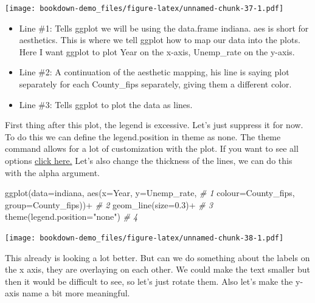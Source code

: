 \documentclass[
]{book}
\newenvironment{Shaded}{\begin{snugshade}}{\end{snugshade}}
\newcommand{\AttributeTok}[1]{\textcolor[rgb]{0.77,0.63,0.00}{#1}}
\newcommand{\CommentTok}[1]{\textcolor[rgb]{0.56,0.35,0.01}{\textit{#1}}}
\newcommand{\FloatTok}[1]{\textcolor[rgb]{0.00,0.00,0.81}{#1}}
\newcommand{\FunctionTok}[1]{\textcolor[rgb]{0.00,0.00,0.00}{#1}}
\newcommand{\NormalTok}[1]{#1}
\newcommand{\SpecialCharTok}[1]{\textcolor[rgb]{0.00,0.00,0.00}{#1}}
\newcommand{\StringTok}[1]{\textcolor[rgb]{0.31,0.60,0.02}{#1}}
\providecommand{\tightlist}{%
  \setlength{\itemsep}{0pt}\setlength{\parskip}{0pt}}
\begin{document}
\texttt{[image: bookdown-demo\_files/figure-latex/unnamed-chunk-37-1.pdf]}

\begin{itemize}
\tightlist
\item
  Line \#1: Tells ggplot we will be using the data.frame indiana. aes is short for aesthetics. This is where we tell ggplot how to map our data into the plots. Here I want ggplot to plot Year on the x-axis, Unemp\_rate on the y-axis.
\item
  Line \#2: A continuation of the aesthetic mapping, his line is saying plot separately for each County\_fips separately, giving them a different color.
\item
  Line \#3: Tells ggplot to plot the data as lines.
\end{itemize}

First thing after this plot, the legend is excessive. Let's just suppress it for now. To do this we can define the legend.position in theme as none. The theme command allows for a lot of customization with the plot. If you want to see all options \href{https://ggplot2.tidyverse.org/reference/theme.html}{click here.} Let's also change the thickness of the lines, we can do this with the alpha argument.

\begin{Shaded}
\begin{Highlighting}[]
\FunctionTok{ggplot}\NormalTok{(}\AttributeTok{data=}\NormalTok{indiana, }\FunctionTok{aes}\NormalTok{(}\AttributeTok{x=}\NormalTok{Year, }\AttributeTok{y=}\NormalTok{Unemp\_rate,   }\CommentTok{\# 1}
    \AttributeTok{colour=}\NormalTok{County\_fips, }\AttributeTok{group=}\NormalTok{County\_fips))}\SpecialCharTok{+}     \CommentTok{\# 2}
  \FunctionTok{geom\_line}\NormalTok{(}\AttributeTok{size=}\FloatTok{0.3}\NormalTok{)}\SpecialCharTok{+}                           \CommentTok{\# 3}
  \FunctionTok{theme}\NormalTok{(}\AttributeTok{legend.position=}\StringTok{"none"}\NormalTok{)                  }\CommentTok{\# 4}
\end{Highlighting}
\end{Shaded}

\texttt{[image: bookdown-demo\_files/figure-latex/unnamed-chunk-38-1.pdf]}

This already is looking a lot better. But can we do something about the labels on the x axis, they are overlaying on each other. We could make the text smaller but then it would be difficult to see, so let's just rotate them. Also let's make the y-axis name a bit more meaningful.
\end{document}
